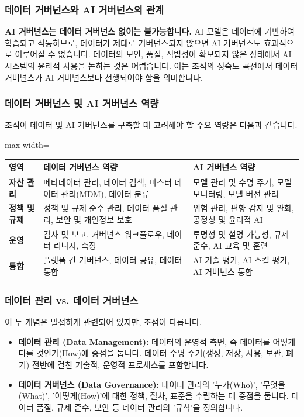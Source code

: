 \documentclass[11pt,a4paper]{article}
\begin{document}
\subsubsection*{데이터 거버넌스와 AI 거버넌스의 관계}
\begin{cautionbox}
\textbf{AI 거버넌스는 데이터 거버넌스 없이는 불가능합니다.}
AI 모델은 데이터에 기반하여 학습되고 작동하므로, 데이터가 제대로 거버넌스되지 않으면 AI 거버넌스도 효과적으로 이루어질 수 없습니다. 데이터의 보안, 품질, 적법성이 확보되지 않은 상태에서 AI 시스템의 윤리적 사용을 논하는 것은 어렵습니다. 이는 조직의 성숙도 곡선에서 데이터 거버넌스가 AI 거버넌스보다 선행되어야 함을 의미합니다.
\end{cautionbox}

\subsubsection*{데이터 거버넌스 및 AI 거버넌스 역량}
조직이 데이터 및 AI 거버넌스를 구축할 때 고려해야 할 주요 역량은 다음과 같습니다.

\begin{adjustbox}{max width=\textwidth}
\begin{tabular}{p{}p{}p{}}
\toprule
\textbf{영역} & \textbf{데이터 거버넌스 역량} & \textbf{AI 거버넌스 역량} \\
\midrule
\textbf{자산 관리} & 메타데이터 관리, 데이터 검색, 마스터 데이터 관리(MDM), 데이터 분류 & 모델 관리 및 수명 주기, 모델 모니터링, 모델 버전 관리 \\
\textbf{정책 및 규제} & 정책 및 규제 준수 관리, 데이터 품질 관리, 보안 및 개인정보 보호 & 위험 관리, 편향 감지 및 완화, 공정성 및 윤리적 AI \\
\textbf{운영} & 감사 및 보고, 거버넌스 워크플로우, 데이터 리니지, 측정 & 투명성 및 설명 가능성, 규제 준수, AI 교육 및 훈련 \\
\textbf{통합} & 플랫폼 간 거버넌스, 데이터 공유, 데이터 통합 & AI 기술 평가, AI 스킬 평가, AI 거버넌스 통합 \\
\bottomrule
\end{tabular}
\end{adjustbox}
\label{tab:gov_capabilities}

\subsubsection*{데이터 관리 vs. 데이터 거버넌스}
이 두 개념은 밀접하게 관련되어 있지만, 초점이 다릅니다.
\begin{itemize}
    \item \textbf{데이터 관리 (Data Management):} 데이터의 운영적 측면, 즉 데이터를 어떻게 다룰 것인가(How)에 중점을 둡니다. 데이터 수명 주기(생성, 저장, 사용, 보관, 폐기) 전반에 걸친 기술적, 운영적 프로세스를 포함합니다.
    \item \textbf{데이터 거버넌스 (Data Governance):} 데이터 관리의 '누가(Who)', '무엇을(What)', '어떻게(How)'에 대한 정책, 절차, 표준을 수립하는 데 중점을 둡니다. 데이터 품질, 규제 준수, 보안 등 데이터 관리의 '규칙'을 정의합니다.
\end{itemize}
\end{document}
